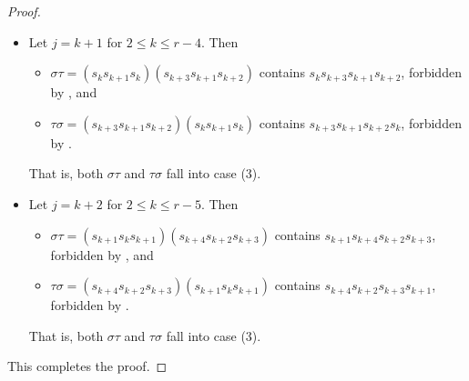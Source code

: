 \documentclass[10pt,a4paper]{amsart}
\begin{document}
\begin{proof}
\begin{itemize}
\begin{itemize}
            \item $\tau\sigma=(s_{k+2}s_{k}s_{k+1})(s_ks_{k+1}s_k)=(s_{k+2}s_ks_{k+1})(s_{k+1}s_ks_{k+1}) = s_{k+2}s_{k+1}\in S$.
        \end{itemize}
        That is, $\sigma\tau$ falls into case (3) and $\tau\sigma$ falls into case (1).
        \item Let $j=k+1$ for $2\leq k\leq r-4$. Then \begin{itemize}
            \item $\sigma\tau=(s_ks_{k+1}s_k)(s_{k+3}s_{k+1}s_{k+2})$ contains $s_ks_{k+3}s_{k+1}s_{k+2}$, forbidden by , and
            \item $\tau\sigma=(s_{k+3}s_{k+1}s_{k+2})(s_ks_{k+1}s_k)$ contains $s_{k+3}s_{k+1}s_{k+2}s_k$, forbidden by .
        \end{itemize}
        That is, both $\sigma\tau$ and $\tau\sigma$ fall into case (3).
        \item Let $j=k+2$ for $2\leq k\leq r-5$. Then \begin{itemize}
            \item $\sigma\tau=(s_{k+1}s_{k}s_{k+1})(s_{k+4}s_{k+2}s_{k+3})$ contains $s_{k+1}s_{k+4}s_{k+2}s_{k+3}$, forbidden by , and
            \item $\tau\sigma=(s_{k+4}s_{k+2}s_{k+3})(s_{k+1}s_ks_{k+1})$ contains $s_{k+4}s_{k+2}s_{k+3}s_{k+1}$, forbidden by .
        \end{itemize}
        That is, both $\sigma\tau$ and $\tau\sigma$ fall into case (3).
    \end{itemize}
   This completes the proof.
\end{proof}
\end{document}
